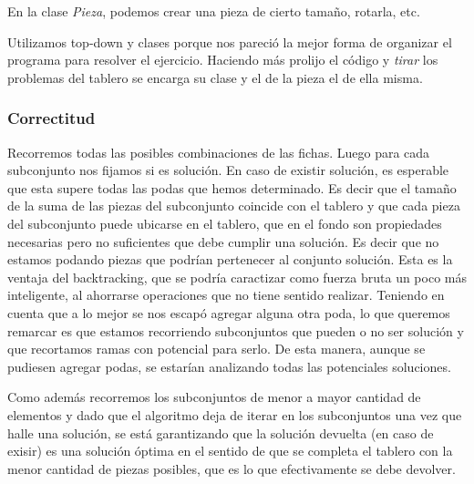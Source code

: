 \quad En la clase \textit{Pieza}, podemos crear una pieza de cierto tama\~no, rotarla, etc.

\quad Utilizamos top-down y clases porque nos pareci\'o la mejor forma de organizar el programa para resolver el ejercicio. Haciendo m\'as prolijo el c\'odigo y \textit{tirar} los problemas del tablero se encarga su clase y el de la pieza el de ella misma.



\subsubsection{Correctitud}


\quad Recorremos todas las posibles combinaciones de las fichas. Luego para cada subconjunto nos fijamos si es solución. En caso de existir solución, es esperable que esta supere todas las podas que hemos determinado. Es decir que el tamaño de la suma de las piezas del subconjunto coincide con el tablero y que cada pieza del subconjunto puede ubicarse en el tablero, que en el fondo son propiedades necesarias pero no suficientes que debe cumplir una solución. Es decir que no estamos podando piezas que podrían pertenecer al conjunto solución. Esta es la ventaja del backtracking, que se podría caractizar como fuerza bruta un poco más inteligente, al ahorrarse operaciones que no tiene sentido realizar. 
\quad Teniendo en cuenta que a lo mejor se nos escapó agregar alguna otra poda, lo que queremos remarcar es que estamos recorriendo subconjuntos que pueden o no ser solución y que recortamos ramas con potencial para serlo. De esta manera, aunque se pudiesen agregar podas, se estarían analizando todas las potenciales soluciones.

\quad Como además recorremos los subconjuntos de menor a mayor cantidad de elementos y dado que el algoritmo deja de iterar en los subconjuntos una vez que halle una solución, se está garantizando que la solución devuelta (en caso de exisir) es una solución óptima en el sentido de que se completa el tablero con la menor cantidad de piezas posibles, que es lo que efectivamente se debe devolver.
\quad 

